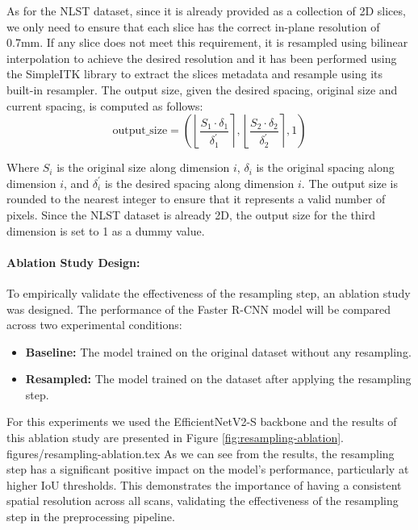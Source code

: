 As for the NLST dataset, since it is already provided as a collection of 2D slices, we only need to ensure that each slice has the correct in-plane resolution of 0.7mm. If any slice does not meet this requirement, it is resampled using bilinear interpolation to achieve the desired resolution and it has been performed using the SimpleITK library \cite{lowekamp2013simpleitk} to extract the slices metadata and resample using its built-in resampler. The output size, given the desired spacing, original size and current spacing, is computed as follows:
$$
\text{output\_size} = \left( \left\lfloor\frac{S_1 \cdot \delta_1}{\delta_1^\prime}\right\rceil, \left\lfloor\frac{S_2 \cdot \delta_2}{\delta_2^\prime}\right\rceil, 1 \right)
$$

Where \(S_i\) is the original size along dimension \(i\), \(\delta_i\) is the original spacing along dimension \(i\), and \(\delta_i^\prime\) is the desired spacing along dimension \(i\). The output size is rounded to the nearest integer to ensure that it represents a valid number of pixels. Since the NLST dataset is already 2D, the output size for the third dimension is set to 1 as a dummy value.

\paragraph{Ablation Study Design:}
To empirically validate the effectiveness of the resampling step, an ablation study was designed. The performance of the Faster R-CNN model will be compared across two experimental conditions: 
\begin{itemize}
    \item \textbf{Baseline:} The model trained on the original dataset without any resampling.
    \item \textbf{Resampled:} The model trained on the dataset after applying the resampling step.
\end{itemize}
For this experiments we used the EfficientNetV2-S backbone \cite{tan2020efficientnet} and the results of this ablation study are presented in Figure \ref{fig:resampling-ablation}.
 {figures/resampling-ablation.tex}
As we can see from the results, the resampling step has a significant positive impact on the model's performance, particularly at higher IoU thresholds. This demonstrates the importance of having a consistent spatial resolution across all scans, validating the effectiveness of the resampling step in the preprocessing pipeline.


